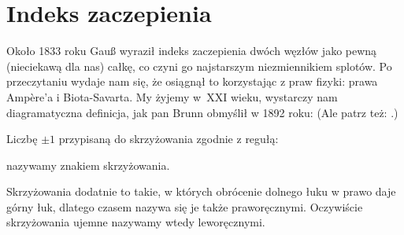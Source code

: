 
\section{Indeks zaczepienia}
%
Około 1833 roku Gauß wyraził indeks zaczepienia dwóch węzłów jako pewną (nieciekawą dla nas) całkę, co czyni go najstarszym niezmiennikiem splotów.
%
Po przeczytaniu \cite{colberg2013} wydaje nam się, że osiągnął to korzystając z praw fizyki: prawa Ampère'a i Biota-Savarta.
My żyjemy w~XXI wieku, wystarczy nam diagramatyczna definicja, jak pan Brunn obmyślił w 1892 roku:
(Ale patrz też: \cite[s. 11]{kawauchi1996}.)

\begin{definition}[znak]
%
    Liczbę $\pm 1$ przypisaną do skrzyżowania zgodnie z regułą:
\begin{comment}
    \setlength{\intextsep}{4pt plus 2pt minus 2pt}
    \begin{figure}[H]
        \begin{minipage}[b]{.48\linewidth}
            \[
                \sign \left( \MedLarPlusCrossingArrows \right) = +1
            \]
        \end{minipage}
        \begin{minipage}[b]{.48\linewidth}
            \[
                \sign \left( \MedLarMinusCrossingArrows \right) = -1
            \]
        \end{minipage}

    \end{figure}
\end{comment}
\noindent
    nazywamy znakiem skrzyżowania.
\end{definition}

Skrzyżowania dodatnie to takie, w których obrócenie dolnego łuku w prawo daje górny łuk, dlatego czasem nazywa się je także praworęcznymi.
Oczywiście skrzyżowania ujemne nazywamy wtedy leworęcznymi.
%
%

